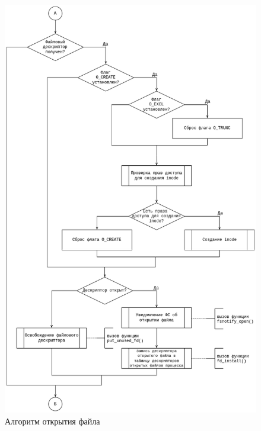 \documentclass[12pt,a4paper]{scrreprt}
\begin{document}
\begin{figure}[H]
	\centering
	\includegraphics[scale=0.45]{pics/1_2.png}
	\caption{Алгоритм открытия файла}
\end{figure}
\end{document}
